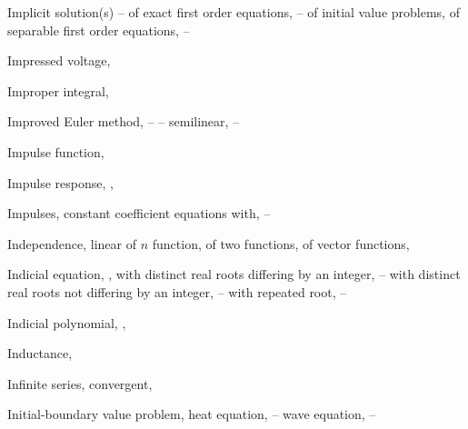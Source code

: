 \begin{theindex}
  \item Implicit solution(s) \pageref{eq:2.5.3}--\pageref{eq:2.5.8}
    \subitem of exact first order equations, \pageref{eq:2.5.3}--\pageref{eq:2.5.8}
    \subitem of initial value problems, \pageref{thmtype:2.2.1}
    \subitem of separable first order equations, \pageref{thmtype:2.2.1}--\pageref{example:2.2.5}

  \item Impressed voltage, \pageref{exer:2.2.26}

  \item Improper integral, \pageref{eq:8.1.1}

  \item Improved Euler method, \pageref{exer:3.1.23}--\pageref{example:3.2.4} \pageref{example:3.3.2}--\pageref{example:3.3.4}
    \subitem semilinear, \pageref{example:3.2.4}--\pageref{eq:3.2.7}

  \item Impulse function, \pageref{exer:8.6.14}

  \item Impulse response, \pageref{exer:8.6.1}, \pageref{thmtype:8.7.2}

  \item Impulses, constant coefficient equations with, \pageref{exer:8.6.14}--\pageref{exer:8.7.30}

  \item Independence, linear
    \subitem of $n$ function, \pageref{thmtype:9.1.2}
    \subitem of two functions, \pageref{thmtype:5.1.3}
    \subitem of vector functions, \pageref{exer:10.3.2}

  \item Indicial equation, \pageref{eq:7.4.7}, \pageref{thmtype:7.5.3}
    \subitem with distinct real roots differing by an integer, \pageref{thmtype:7.7.1}--\pageref{exer:7.7.48}
    \subitem with distinct real roots not differing by an integer, \pageref{thmtype:7.5.3}--\pageref{exer:7.5.68}
    \subitem with repeated root, \pageref{eq:7.6.1}--\pageref{exer:7.6.66}

  \item Indicial polynomial, \pageref{eq:7.4.7}, \pageref{thmtype:7.5.3}

  \item Inductance, \pageref{eq:6.3.2}

  \item Infinite series, convergent, \pageref{thmtype:12.1.2}

  \item Initial-boundary value problem, \pageref{eq:12.1.1}
    \subitem heat equation, \pageref{eq:12.1.1}--\pageref{eq:12.1.12}
    \subitem wave equation, \pageref{eq:12.2.1}--\pageref{exer:12.2.68}


\end{theindex}

